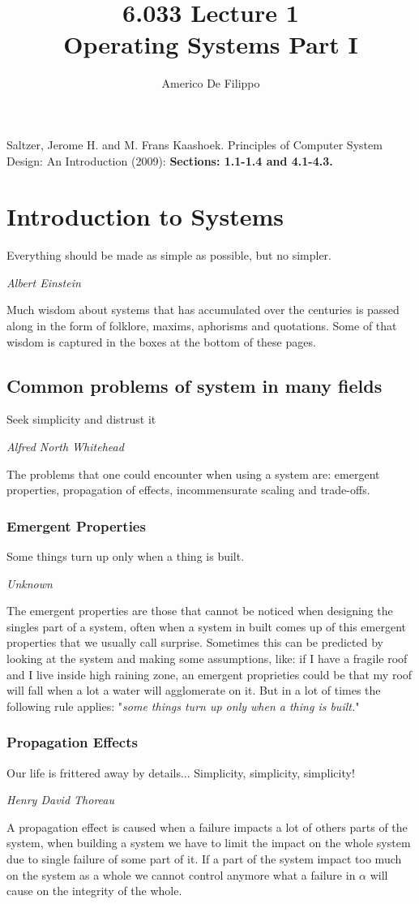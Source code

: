 \documentclass{article}
\title{6.033 Lecture 1 \\ Operating Systems Part I}
\author{Americo De Filippo}
\begin{document}
\maketitle
\begin{thebibliography}{9}
  Saltzer, Jerome H. and M. Frans Kaashoek. Principles of Computer System Design: An Introduction (2009): \textbf{Sections: 1.1-1.4 and 4.1-4.3.}
\end{thebibliography}
\tableofcontents
\section{Introduction to Systems}
  \epigraph{Everything should be made as simple as possible, but no simpler.}{\textit{Albert Einstein}}
  Much wisdom about systems that has accumulated over the centuries is passed along 
  in the form of folklore, maxims, aphorisms and quotations. Some of that wisdom is 
  captured in the boxes at the bottom of these pages.
  \subsection{Common problems of system in many fields}
    \epigraph{Seek simplicity and distrust it}{\textit{Alfred North Whitehead}}
    The problems that one could encounter when using a system are: emergent properties, propagation of effects, incommensurate scaling and 
    trade-offs. 
  \subsubsection{Emergent Properties}
    \epigraph{Some things turn up only when a thing is built.}{\textit{Unknown}}
    The emergent properties are those that cannot be noticed when designing the singles part of a system, often when a system in built comes 
    up of this emergent properties that we usually call surprise. Sometimes this can be predicted by looking at the system and making 
    some assumptions, like: if I have a fragile roof and I live inside high raining zone, an emergent proprieties could be that 
    my roof will fall when a lot a water will agglomerate on it. But in a lot of times the following rule applies: "\emph{some things turn up only when a thing is built.}"
  \subsubsection{Propagation Effects}
    \epigraph{Our life is frittered away by details... Simplicity, simplicity, simplicity!}{\textit{Henry David Thoreau}}
    A propagation effect is caused when a failure impacts a lot of others parts of the system, when building a system we have to limit the impact 
    on the whole system due to single failure of some part of it. If a part of the system impact too much on the system as a whole we cannot control 
    anymore what a failure in $\alpha$ will cause on the integrity of the whole.
\end{document}
